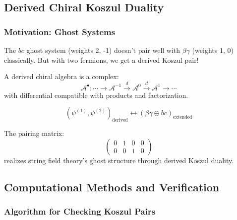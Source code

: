 
\subsection{Derived Chiral Koszul Duality}

\subsubsection{Motivation: Ghost Systems}

The $bc$ ghost system (weights 2, -1) doesn't pair well with $\beta\gamma$ (weights 1, 0) classically. But with two fermions, we get a derived Koszul pair!

\begin{definition}
A derived chiral algebra is a complex:
$$\mathcal{A}^{\bullet}: \cdots \to \mathcal{A}^{-1} \xrightarrow{d} \mathcal{A}^0 \xrightarrow{d} \mathcal{A}^1 \to \cdots$$
with differential compatible with products and factorization.
\end{definition}

\begin{theorem}
$$(\psi^{(1)}, \psi^{(2)})_{\text{derived}} \leftrightarrow (\beta\gamma \oplus bc)_{\text{extended}}$$

The pairing matrix:
$$\begin{pmatrix}
0 & 1 & 0 & 0 \\
0 & 0 & 1 & 0
\end{pmatrix}$$
realizes string field theory's ghost structure through derived Koszul duality.
\end{theorem}


\subsection{Computational Methods and Verification}

\subsubsection{Algorithm for Checking Koszul Pairs}

